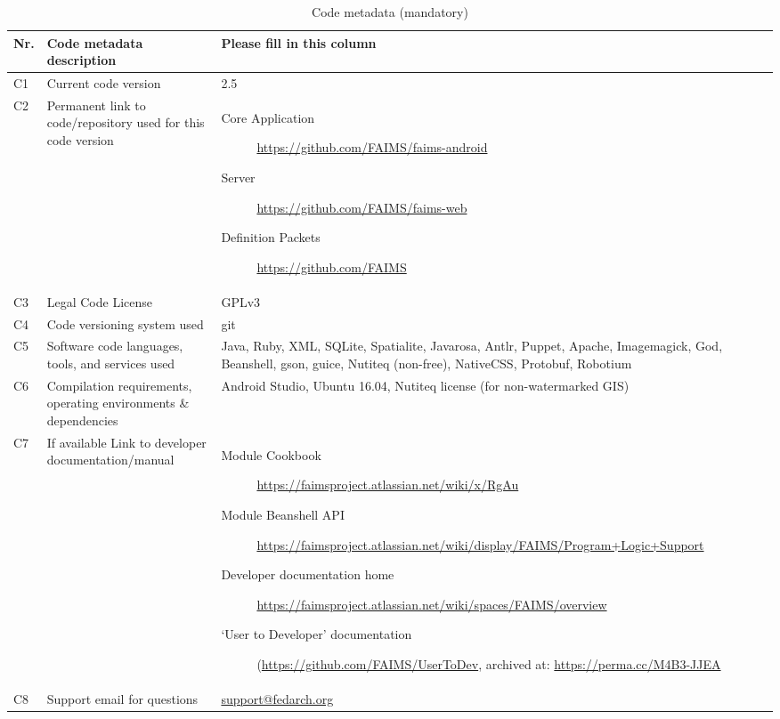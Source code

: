 \documentclass[preprint,12pt, a4paper]{elsarticle}
\begin{document}
\begin{table}[!h]
\begin{tabular}{|l|p{6.5cm}|p{6.5cm}|}
\hline
\textbf{Nr.} & \textbf{Code metadata description} & \textbf{Please fill in this column} \\
\hline
C1 & Current code version & 2.5 \\
\hline
C2 & Permanent link to code/repository used for this code version & \begin{description}\item [Core Application] \url{https://github.com/FAIMS/faims-android}
\item [Server] \url{https://github.com/FAIMS/faims-web}
\item [Definition Packets] \url{https://github.com/FAIMS}  
\end{description}
\\
\hline
C3 & Legal Code License   & GPLv3 \\
\hline
C4 & Code versioning system used & git \\
\hline
C5 & Software code languages, tools, and services used & Java, Ruby, XML, SQLite, Spatialite, Javarosa, Antlr, Puppet, Apache, Imagemagick, God, Beanshell, gson, guice, Nutiteq (non-free), NativeCSS, Protobuf, Robotium \\
\hline
C6 & Compilation requirements, operating environments \& dependencies & Android Studio, Ubuntu 16.04, Nutiteq license (for non-watermarked GIS)\\
\hline
C7 & If available Link to developer documentation/manual & \begin{description} \item [Module Cookbook] \url{https://faimsproject.atlassian.net/wiki/x/RgAu} 
\item [Module Beanshell API] \url{https://faimsproject.atlassian.net/wiki/display/FAIMS/Program+Logic+Support}
\item [Developer documentation home] \url{https://faimsproject.atlassian.net/wiki/spaces/FAIMS/overview}
\item [`User to Developer' documentation] (\url{https://github.com/FAIMS/UserToDev}, archived at: \url{https://perma.cc/M4B3-JJEA}
\end{description}
 \\
\hline
C8 & Support email for questions & \url{support@fedarch.org} \\
\hline
\end{tabular}
\caption{Code metadata (mandatory)}

\end{table}
\end{document}
